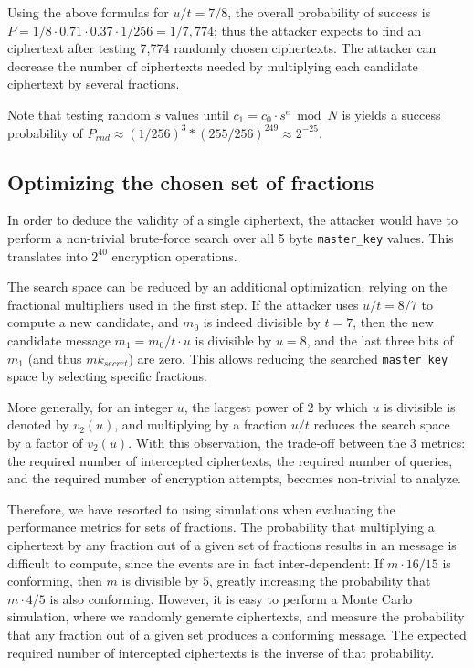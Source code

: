 Using the above formulas for $u/t = 7/8$,
the overall probability of success is $P = 1/8 \cdot 0.71 \cdot 0.37 \cdot 1/256 = 1 / 7,774$; thus the attacker expects to find an \sslconform ciphertext after testing 7,774 randomly chosen \tlsconform ciphertexts.  The attacker can decrease the number of \tlsconform ciphertexts needed by multiplying each candidate ciphertext by several fractions.

Note that testing random $s$ values until $c_1 = c_0 \cdot s^e \bmod N$ is \sslconform yields a success probability of
$P_{rnd} \approx (1/256)^3 * (255/256)^{249} \approx 2^{-25}$.

\subsection{Optimizing the chosen set of fractions}
\label{sec:fraction-optimization}

In order to deduce the validity of a single ciphertext, the attacker would have to perform a non-trivial brute-force search over all 5 byte \texttt{master\_key} values. This translates into $2^{40}$ encryption operations.

The search space can be reduced by an additional optimization, relying on the fractional multipliers used in the first step.
If the attacker uses $u/t=8/7$ to compute a new \sslconform candidate, and $m_0$ is indeed divisible by $t=7$,
then the new candidate message $m_1 = m_0 / t \cdot u$ is divisible by $u=8$, and the last three bits of $m_1$ (and thus \texttt{$mk_{secret}$}) are zero. 
This allows reducing the searched \texttt{master\_key} space by selecting specific fractions.

More generally, for an integer $u$, the largest power of 2 by which $u$ is
divisible is denoted by $v_2(u)$, and multiplying by a fraction $u/t$ reduces
the search space by a factor of $v_2(u)$.
With this observation, the trade-off between the 3 metrics: the required number of intercepted ciphertexts, the required number of queries, and the required number of encryption attempts, becomes non-trivial to analyze.

Therefore, we have resorted to using simulations when evaluating the performance metrics for sets of fractions.
The probability that multiplying a ciphertext by any fraction out of a given set of fractions results in an \sslconform message is difficult to compute, since the events are in fact inter-dependent: If $m \cdot 16/15$ is conforming, then $m$ is divisible by $5$, greatly increasing the probability that $m \cdot 4/5$ is also conforming.
However, it is easy to perform a Monte Carlo simulation, where we randomly generate ciphertexts, and measure the probability that any fraction out of a given set produces a conforming message.
The expected required number of intercepted ciphertexts is the inverse of that probability.

